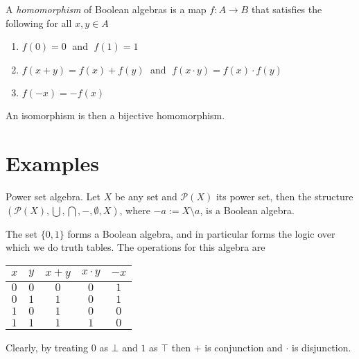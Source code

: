 \documentclass[12pt]{article}
\begin{document}
\begin{definition}
A \textit{homomorphism} of Boolean algebras is a map $f: A\longrightarrow B$ that satisfies the following for all $x,y\in A$
\begin{enumerate}
    \item[] $f(0)=0\;$ and $\;f(1)=1$
    \item[] $f(x+y)=f(x)+f(y)\;$ and $\;f(x\cdot y)=f(x)\cdot f(y)$
    \item[] $f(-x)=-f(x)$
\end{enumerate}
\end{definition}
An isomorphism is then a bijective homomorphism.

\section{Examples}

\begin{example}
Power set algebra. Let $X$ be any set and $\mathcal{P}(X)$ its power set, then the structure $\left(\mathcal{P}(X),\bigcup,\bigcap,-,\emptyset,X\right)$, where $-a:=X\setminus a$, is a Boolean algebra.
\end{example}

\begin{example}
The set $\{0,1\}$ forms a Boolean algebra, and in particular forms the logic over which we do truth tables. The operations for this algebra are
\end{example}

\begin{tabular}{c c | c c c}
$x$ & $y$ & $x+y$ & $x\cdot y$ & $-x$\\
\hline
$0$ & $0$ & $0$ &$0$&$1$\\
$0$&$1$&$1$&$0$&$1$\\
$1$&$0$&$1$&$0$&$0$\\
$1$&$1$&$1$&$1$&$0$
\end{tabular}

Clearly, by treating $0$ as $\bot$ and $1$ as $\top$ then $+$ is conjunction and $\cdot$ is disjunction.
\end{document}

